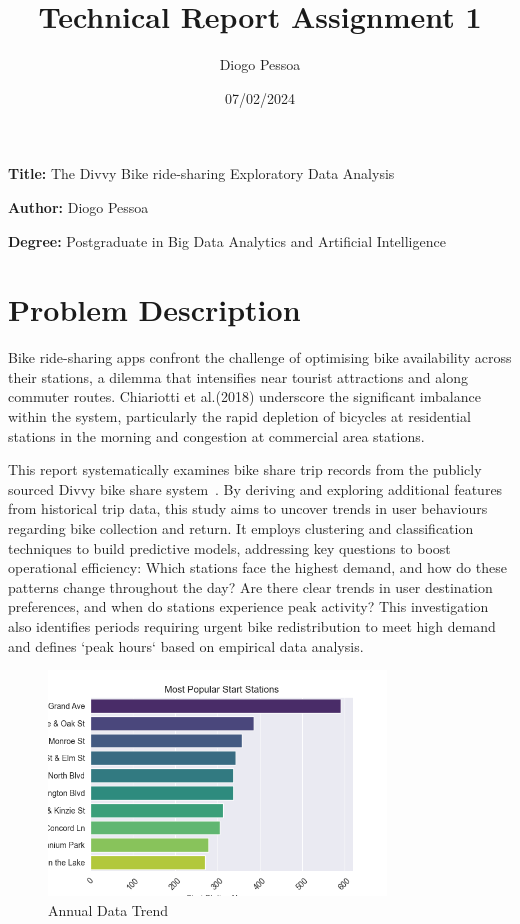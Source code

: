 \documentclass[12pt, a4paper]{article}
\title{Technical Report Assignment 1}
\author{Diogo Pessoa}
\date{07/02/2024}
\newcommand{\namelistlabel}[1]{\mbox{#1}\hfil}
\newenvironment{namelist}[1]{%
    \begin{list}{}
    {
        \let\makelabel\namelistlabel
        \settowidth{\labelwidth}{#1}
        \setlength{\leftmargin}{1.1\labelwidth}
    }
    }{%
    \end{list}}
\begin{document}
    \maketitle
    \begin{namelist}{xxxxxxxxxxxx}
        \item[\textbf{Title:}]
        The Divvy Bike ride-sharing Exploratory Data Analysis
        \item[\textbf{Author:}]
        Diogo Pessoa
        \item[\textbf{Degree:}]
        Postgraduate in Big Data Analytics and Artificial Intelligence
    \end{namelist}

    \section*{Problem Description}
    \label{sec:ProblemDescription}
    Bike ride-sharing apps confront the challenge of optimising bike availability across their stations, a dilemma that intensifies near tourist attractions and along commuter routes.
    Chiariotti et al.(2018)\cite{Sensors} underscore the significant imbalance within the system,
    particularly the rapid depletion of bicycles at residential stations in the morning and congestion at commercial area stations.

    This report systematically examines bike share trip records from the publicly sourced Divvy bike share system~\cite{DataSource}.
    By deriving and exploring additional features from historical trip data, this study aims to uncover trends in user behaviours regarding bike collection and return.
    It employs clustering and classification techniques to build predictive models, addressing key questions to boost operational efficiency: Which stations face the highest demand,
    and how do these patterns change throughout the day?
    Are there clear trends in user destination preferences, and when do stations experience peak activity?
    This investigation also identifies periods requiring urgent bike redistribution to meet high demand and defines `peak hours` based on empirical data analysis.

    \begin{figure}[htbp]
        \centering
        \includegraphics[width=0.8\textwidth]{images/count_most_popular_start_stations}
        \caption{Annual Data Trend}
        \label{fig:graph1}
    \end{figure}
\end{document}
